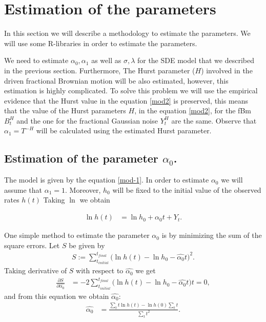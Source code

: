 \documentclass[smallextended]{svjour3}
\begin{document}
\section{Estimation of the parameters}
\label{esti}

In this section we will describe a methodology to estimate the parameters.
We will use some R-libraries in order to estimate the parameters. 

We need to estimate $\alpha_0, \alpha_1$ as well as $\sigma,\lambda$ for the
SDE model that we described in the previous section. Furthermore,
The Hurst parameter ($H$) involved in the driven fractional Brownian motion
will be also estimated, however, this estimation is highly complicated.
To solve this problem we will use the empirical evidence that the Hurst value
in the equation \eqref{mod2}
is preserved, this means that the  value of the  Hurst parameters $H$, in the
equation \eqref{mod2}, for the fBm $B_t^H$ and the one for the
fractional Gaussian noise $Y_t^H$ are the same. Observe that $\alpha_1=T^{-H}$
will be calculated using the estimated Hurst parameter.

\subsection{Estimation of the parameter $\alpha_0$.}


The model is given by the equation \eqref{mod-1}. In order to estimate
$\alpha_0$ we will assume that $\alpha_1=1$. Moreover, $h_0$ will be fixed to
the initial value of the observed rates $h(t)$ Taking $\ln$ we obtain

\begin{align}
\ln h(t)&=\ln h_0+\alpha_0t+Y_t. \label{mod-ln}
\end{align}

One simple method to estimate the parameter $\alpha_0$ is by minimizing the sum
of the square errors.
Let $S$ be given by
\begin{align*}
S:= \sum_{t_{initial}}^{t_{final}} \Big( \ln h(t)-\ln h_0-\widehat{\alpha_0} t
\Big)^2. %
\end{align*}
Taking derivative of $S$ with respect
to $\widehat{\alpha_0}$  we get
\begin{align*}
\frac{\partial S}{\partial \widehat{\alpha_0}}&=
-2\sum_{t_{initial}}^{t_{final}} \Big( \ln h(t)-\ln h_0-\widehat{\alpha_0} t
\Big) t =0, %
\end{align*}
and from this equation we obtain $\widehat{\alpha_0}$:
\begin{align}
\widehat{\alpha_0} &= \frac{\sum_{t} t\ln h(t) - \ln h(0)\sum_{t} t}{\sum_{t}
t^2}. \label{alpha0}
\end{align}
\end{document}
